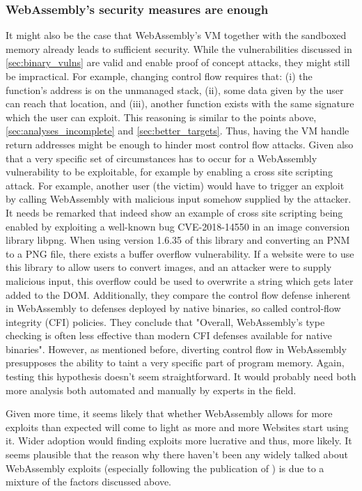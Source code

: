 \documentclass[sigconf]{acmart}
\begin{document}
\subsubsection{WebAssembly's security measures are enough}
\label{sec:wasm_sec_strong}
It might also be the case that WebAssembly's VM together with the sandboxed memory already leads to sufficient security. While the vulnerabilities discussed in \ref{sec:binary_vulns} are valid and enable proof of concept attacks, they might still be impractical. For example, changing control flow requires that: (i) the function's address is on the unmanaged stack, (ii), some data given by the user can reach that location, and (iii), another function exists with the same signature which the user can exploit. This reasoning is similar to the points above, \ref{sec:analyses_incomplete} and \ref{sec:better_targets}. Thus, having the VM handle return addresses might be enough to hinder most control flow attacks. Given also that a very specific set of circumstances has to occur for a WebAssembly vulnerability to be exploitable, for example by enabling a cross site scripting attack. For example, another user (the victim) would have to trigger an exploit by calling WebAssembly with malicious input somehow supplied by the attacker. It needs be remarked that \cite{lehmann_everything_2020} indeed show an example of cross site scripting being enabled by exploiting a well-known bug CVE-2018-14550 in an image conversion library libpng. When using version 1.6.35 of this library and converting an PNM to a PNG file, there exists a buffer overflow vulnerability. If a website were to use this library to allow users to convert images, and an attacker were to supply malicious input, this overflow could be used to overwrite a string which gets later added to the DOM. Additionally, they compare the control flow defense inherent in WebAssembly to defenses deployed by native binaries, so called control-flow integrity (CFI) policies. They conclude that "Overall, WebAssembly’s type checking is often less effective than modern CFI defenses available for native binaries". However, as mentioned before, diverting control flow in WebAssembly presupposes the ability to taint a very specific part of program memory. Again, testing this hypothesis doesn't seem straightforward. It would probably need both more analysis both automated and manually by experts in the field.

Given more time, it seems likely that whether WebAssembly allows for more exploits than expected will come to light as more and more Websites start using it. Wider adoption would finding exploits more lucrative and thus, more likely. It seems plausible that the reason why there haven't been any widely talked about WebAssembly exploits (especially following the publication of \cite{lehmann_everything_2020}) is due to a mixture of the factors discussed above.
\end{document}
